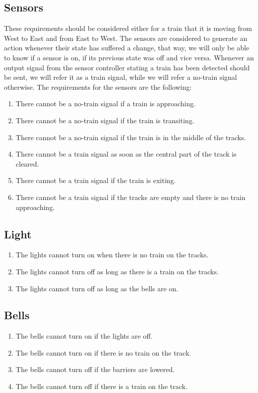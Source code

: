 \documentclass[final]{report}
\begin{document}
\subsection{Sensors}
These requirements should be considered either for a train that it is moving from West to East and from East to West. 
The sensors are considered to generate an action whenever their state has suffered a change, that way, we will only be able to know if a sensor is on, if its previous state was off and vice versa. 
Whenever an output signal from the sensor controller stating a train has been detected should be sent, we will refer it as a train signal, while we will refer a no-train signal otherwise. The requirements for the sensors are the following:
	\begin{enumerate}
		\item There cannot be a no-train signal if a train is approaching.
		\item There cannot be a no-train signal if the train is transiting.
		\item There cannot be a no-train signal if the train is in the middle of the tracks.
		\item There cannot be a train signal as soon as the central part of the track is cleared.
		\item There cannot be a train signal if the train is exiting.
		\item There cannot be a train signal if the tracks are empty and there is no train approaching.
	\end{enumerate}

\subsection{Light}
	\begin{enumerate}
		\item The lights cannot turn on when there is no train on the tracks.
		\item The lights cannot turn off as long as there is a train on the tracks.
		\item The lights cannot turn off as long as the bells are on.
	\end{enumerate}

\subsection{Bells}
	\begin{enumerate}
		\item The bells cannot turn on if the lights are off.
		\item The bells cannot turn on if there is no train on the track.
		\item The bells cannot turn off if the barriers are lowered.
		\item The bells cannot turn off if there is a train on the track.
	\end{enumerate}
\end{document}
